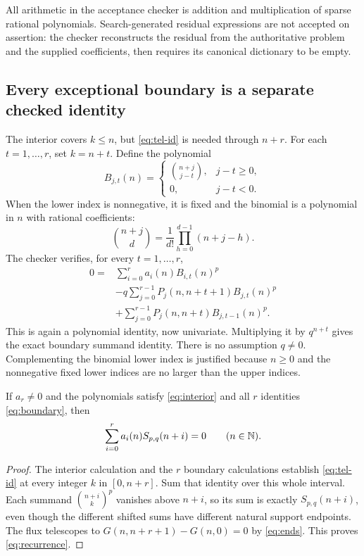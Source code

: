 All arithmetic in the acceptance checker is addition and multiplication of
sparse rational polynomials. Search-generated residual expressions are not
accepted on assertion: the checker reconstructs the residual from the
authoritative problem and the supplied coefficients, then requires its
canonical dictionary to be empty.

\subsection{Every exceptional boundary is a separate checked identity}

The interior covers $k\le n$, but \eqref{eq:tel-id} is needed through $n+r$.
For each $t=1,\ldots,r$, set $k=n+t$. Define the polynomial
\[
B_{j,t}(n)=
\begin{cases}
\displaystyle\binom{n+j}{j-t},&j-t\ge0,\\
0,&j-t<0.
\end{cases}
\]
When the lower index is nonnegative, it is fixed and the binomial is a
polynomial in $n$ with rational coefficients:
\[
\binom{n+j}{d}=\frac{1}{d!}\prod_{h=0}^{d-1}(n+j-h).
\]
The checker verifies, for every $t=1,\ldots,r$,
\begin{equation}\label{eq:boundary}
\begin{split}
0={}&\sum_{i=0}^{r}a_i(n)B_{i,t}(n)^p\\
&-q\sum_{j=0}^{r-1}P_j(n,n+t+1)B_{j,t}(n)^p\\
&+\sum_{j=0}^{r-1}P_j(n,n+t)B_{j,t-1}(n)^p.
\end{split}
\end{equation}
This is again a polynomial identity, now univariate. Multiplying it by
$q^{n+t}$ gives the exact boundary summand identity. There is no assumption
$q\ne0$. Complementing the binomial lower index is justified because $n\ge0$
and the nonnegative fixed lower indices are no larger than the upper indices.

\begin{theorem}\label{thm:tel}
If $a_r\ne0$ and the polynomials satisfy \eqref{eq:interior} and all $r$
identities \eqref{eq:boundary}, then
\begin{equation}\label{eq:recurrence}
\sum_{i=0}^{r}a_i(n)S_{p,q}(n+i)=0\qquad(n\in\mathbb N).
\end{equation}
\end{theorem}
\begin{proof}
The interior calculation and the $r$ boundary calculations establish
\eqref{eq:tel-id} at every integer $k$ in $[0,n+r]$. Sum that identity over this
whole interval. Each summand $\binom{n+i}k^p$ vanishes above $n+i$, so its sum
is exactly $S_{p,q}(n+i)$, even though the different shifted sums have different
natural support endpoints. The flux telescopes to
$G(n,n+r+1)-G(n,0)=0$ by \eqref{eq:ends}. This proves \eqref{eq:recurrence}.
\end{proof}

